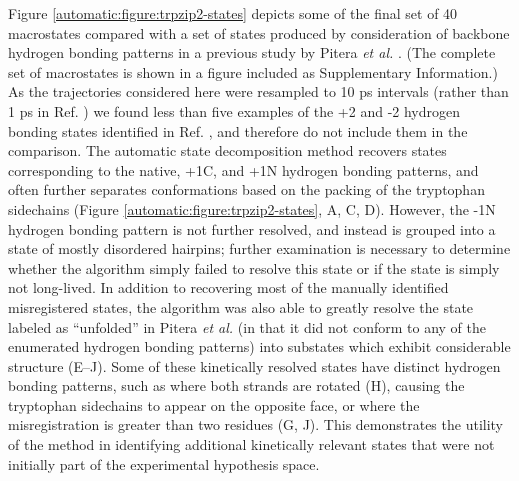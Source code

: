 Figure \ref{automatic:figure:trpzip2-states} depicts some of the final set of 40 macrostates compared with a set of states produced by consideration of backbone hydrogen bonding patterns in a previous study by Pitera \emph{et al.} \cite{pitera:2006a}.
(The complete set of macrostates is shown in a figure included as Supplementary Information.)
As the trajectories considered here were resampled to 10 ps intervals (rather than 1 ps in Ref. \cite{pitera:2006a}) we found less than five examples of the +2 and -2 hydrogen bonding states identified in Ref. \cite{pitera:2006a}, and therefore do not include them in the comparison.
The automatic state decomposition method recovers states corresponding to the native, +1C, and +1N hydrogen bonding patterns, and often further separates conformations based on the packing of the tryptophan sidechains (Figure \ref{automatic:figure:trpzip2-states}, A, C, D).
However, the -1N hydrogen bonding pattern is not further resolved, and instead is grouped into a state of mostly disordered hairpins; further examination is necessary to determine whether the algorithm simply failed to resolve this state or if the state is simply not long-lived.
In addition to recovering most of the manually identified misregistered states, the algorithm was also able to greatly resolve the state labeled as ``unfolded'' in Pitera \emph{et al.} (in that it did not conform to any of the enumerated hydrogen bonding patterns) into substates which exhibit considerable structure (E--J).
Some of these kinetically resolved states have distinct hydrogen bonding patterns, such as where both strands are rotated (H), causing the tryptophan sidechains to appear on the opposite face, or where the misregistration is greater than two residues (G, J). 
This demonstrates the utility of the method in identifying additional kinetically relevant states that were not initially part of the experimental hypothesis space.

